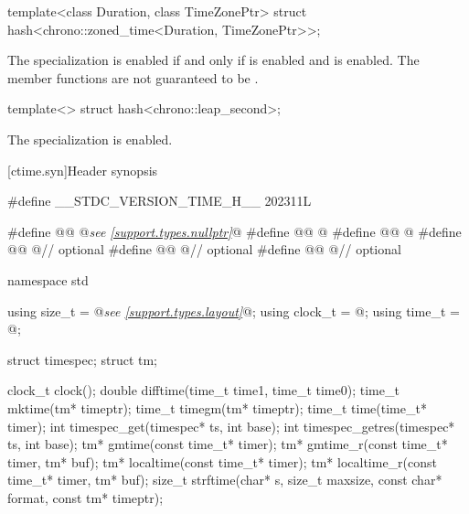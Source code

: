%
\begin{itemdecl}
template<class Duration, class TimeZonePtr>
  struct hash<chrono::zoned_time<Duration, TimeZonePtr>>;
\end{itemdecl}

\begin{itemdescr}
\pnum
The specialization 
is enabled
if and only if  is enabled and
 is enabled.
The member functions are not guaranteed to be .
\end{itemdescr}

%
\begin{itemdecl}
template<> struct hash<chrono::leap_second>;
\end{itemdecl}

\begin{itemdescr}
\pnum
The specialization is enabled.
\end{itemdescr}

[ctime.syn]{Header  synopsis}

%
%
%
%
%
%
%
%
%
%
%
%
%
%
%
%
%
%
\begin{codeblock}
#define __STDC_VERSION_TIME_H__ 202311L

#define @@ @\textit{see \ref{support.types.nullptr}}@
#define @@ @\seebelow@
#define @@ @\seebelow@
#define @@ @\seebelow@     // optional
#define @@ @\seebelow@        // optional
#define @@ @\seebelow@ // optional

namespace std {
  using size_t = @\textit{see \ref{support.types.layout}}@;
  using clock_t = @\seebelow@;
  using time_t = @\seebelow@;

  struct timespec;
  struct tm;

  clock_t clock();
  double difftime(time_t time1, time_t time0);
  time_t mktime(tm* timeptr);
  time_t timegm(tm* timeptr);
  time_t time(time_t* timer);
  int timespec_get(timespec* ts, int base);
  int timespec_getres(timespec* ts, int base);
  tm* gmtime(const time_t* timer);
  tm* gmtime_r(const time_t* timer, tm* buf);
  tm* localtime(const time_t* timer);
  tm* localtime_r(const time_t* timer, tm* buf);
  size_t strftime(char* s, size_t maxsize, const char* format, const tm* timeptr);
}
\end{codeblock}

